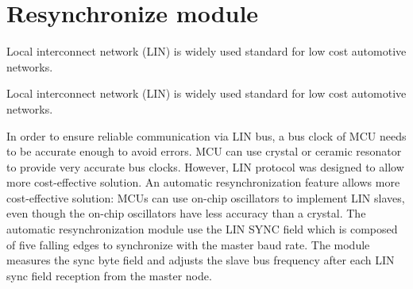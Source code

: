 \hypertarget{group__resync__group}{}\section{Resynchronize module}
\label{group__resync__group}


Local interconnect network (L\+I\+N) is widely used standard for low cost automotive networks.  


Local interconnect network (L\+I\+N) is widely used standard for low cost automotive networks. 

In order to ensure reliable communication via L\+I\+N bus, a bus clock of M\+C\+U needs to be accurate enough to avoid errors. M\+C\+U can use crystal or ceramic resonator to provide very accurate bus clocks. However, L\+I\+N protocol was designed to allow more cost-\/effective solution. An automatic resynchronization feature allows more cost-\/effective solution\+: M\+C\+Us can use on-\/chip oscillators to implement L\+I\+N slaves, even though the on-\/chip oscillators have less accuracy than a crystal. The automatic resynchronization module use the L\+I\+N S\+Y\+N\+C field which is composed of five falling edges to synchronize with the master baud rate. The module measures the sync byte field and adjusts the slave bus frequency after each L\+I\+N sync field reception from the master node. 